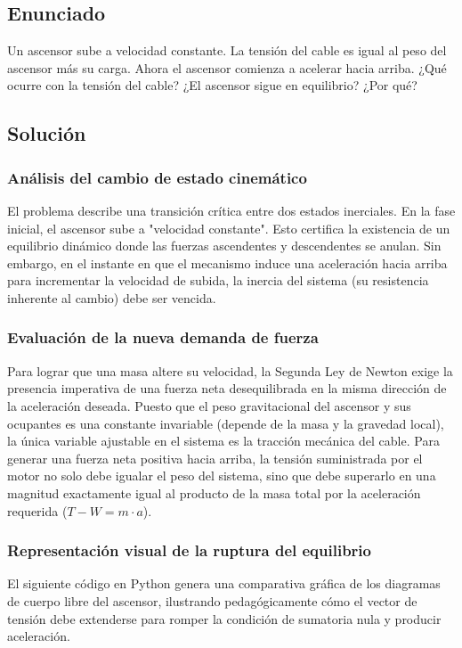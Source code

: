 \documentclass[12pt, a4paper]{article}
\begin{document}
\newpage
\subsection*{Enunciado}
Un ascensor sube a velocidad constante. La tensión del cable es igual al peso del ascensor más su carga. Ahora el ascensor comienza a acelerar hacia arriba. ¿Qué ocurre con la tensión del cable? ¿El ascensor sigue en equilibrio? ¿Por qué?

\subsection*{Solución}

\subsubsection*{Análisis del cambio de estado cinemático}
El problema describe una transición crítica entre dos estados inerciales. En la fase inicial, el ascensor sube a "velocidad constante". Esto certifica la existencia de un equilibrio dinámico donde las fuerzas ascendentes y descendentes se anulan. Sin embargo, en el instante en que el mecanismo induce una aceleración hacia arriba para incrementar la velocidad de subida, la inercia del sistema (su resistencia inherente al cambio) debe ser vencida. 

\subsubsection*{Evaluación de la nueva demanda de fuerza}
Para lograr que una masa altere su velocidad, la Segunda Ley de Newton exige la presencia imperativa de una fuerza neta desequilibrada en la misma dirección de la aceleración deseada. Puesto que el peso gravitacional del ascensor y sus ocupantes es una constante invariable (depende de la masa y la gravedad local), la única variable ajustable en el sistema es la tracción mecánica del cable. Para generar una fuerza neta positiva hacia arriba, la tensión suministrada por el motor no solo debe igualar el peso del sistema, sino que debe superarlo en una magnitud exactamente igual al producto de la masa total por la aceleración requerida ($T - W = m \cdot a$).

\subsubsection*{Representación visual de la ruptura del equilibrio}
El siguiente código en Python genera una comparativa gráfica de los diagramas de cuerpo libre del ascensor, ilustrando pedagógicamente cómo el vector de tensión debe extenderse para romper la condición de sumatoria nula y producir aceleración.
\end{document}
